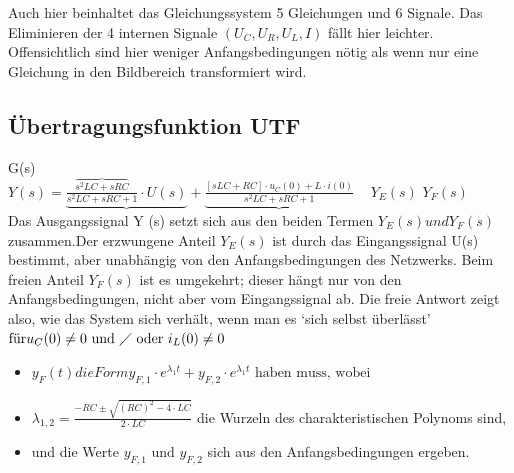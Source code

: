 Auch hier beinhaltet das Gleichungssystem 5 Gleichungen und 6 Signale. Das Eliminieren der 4 internen Signale $(U_{C}, U_{R}, U_{L}, I)$ fällt hier leichter. Offensichtlich sind hier weniger Anfangsbedingungen nötig als wenn nur eine Gleichung in den Bildbereich transformiert wird.

\subsection{Übertragungsfunktion UTF}
\hspace{2.3cm}G(s)\\
$Y(s) = \underbrace{\frac{\overbrace{s^2 LC+sRC}}{s^2 LC +sRC +1}\cdot U(s)} + \underbrace{\frac{[sLC + RC] \cdot u_{C}(0) + L \cdot i(0)}{s^2 LC +sRC +1}}$ \newline
\textcolor{white}{x} \hspace{2.4cm} $Y_{E}(s)$ \hspace{3.8cm} $Y_{F}(s)$ \\
Das Ausgangssignal Y (s) setzt sich aus den beiden Termen $Y_{E}(s) und Y_{F}(s)$ zusammen.Der erzwungene Anteil $Y_{E}(s)$ ist durch das Eingangssignal U(s) bestimmt, aber unabhängig von den Anfangsbedingungen des Netzwerks.
Beim freien Anteil $Y_{F}(s)$ ist es umgekehrt; dieser hängt nur von den Anfangsbedingungen,
nicht aber vom Eingangssignal ab. Die freie Antwort zeigt also, wie
das System sich verhält, wenn man es ‘sich selbst überlässt’
$\text{für} u_{C}(0) \neq 0 \text{ und } \diagup \text{ oder } i_{L}(0) \neq 0$
\begin{itemize}
	\item $ y_{F}(t) die Form y_{F,1} \cdot e^{\lambda_{1}t} + y_{F,2} \cdot e^{\lambda_{1}t} \text{ haben muss, wobei}$
	\item $ \lambda_{1,2}= \frac{-RC \pm \sqrt{(RC)^2 - 4 \cdot LC} }{2 \cdot LC}$ die Wurzeln des charakteristischen Polynoms sind,
	\item und die Werte $y_{F,1} \text{ und } y_{F,2}$ sich aus den Anfangsbedingungen ergeben.
\end{itemize}